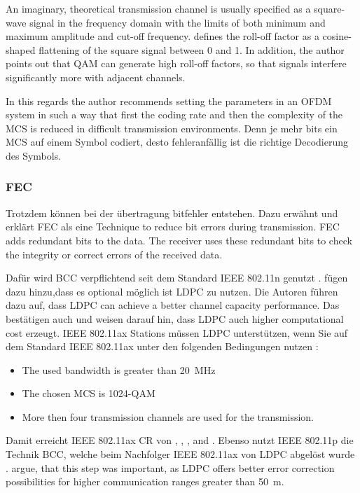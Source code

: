 An imaginary, theoretical transmission channel is usually specified as a square-wave signal in the frequency domain with the limits of both minimum and maximum amplitude and cut-off frequency. \textcite{kauffels_wireless_2002} defines the roll-off factor as a cosine-shaped flattening of the square signal between 0 and 1. In addition, the author points out that \ac{QAM} can generate high roll-off factors, so that signals interfere significantly more with adjacent channels.

In this regards the author recommends setting the parameters in an \ac{OFDM} system in such a way that first the coding rate and then the complexity of the \ac{MCS} is reduced in difficult transmission environments. Denn je mehr bits ein \ac{MCS} auf einem Symbol codiert, desto fehleranfällig ist die richtige Decodierung des Symbols.

\subsubsection*{\acl{FEC}}

Trotzdem können bei der übertragung bitfehler entstehen. Dazu erwähnt und erklärt \cite{knaufel} \ac{FEC} als eine Technique to reduce bit errors during transmission. \ac{FEC} adds redundant bits to the data. The receiver uses these redundant bits to check the integrity or correct errors of the received data. 

Dafür wird \ac{BCC} verpflichtend seit dem Standard IEEE 802.11n genutzt \cite{Challengeax} \cite{performanceLdpc}. \textcite{performanceLdpc} fügen dazu hinzu,dass es optional möglich ist \ac{LDPC} zu nutzen. Die Autoren führen dazu auf, dass \ac{LDPC} can achieve a better channel capacity performance. Das bestätigen auch \textcite{Challengeax} und weisen darauf hin, dass \ac{LDPC} auch higher computational cost erzeugt. 
IEEE 802.11ax Stations müssen \ac{LDPC} unterstützen, wenn Sie auf dem Standard IEEE 802.11ax unter den folgenden Bedingungen nutzen \cite{Challengeax} \cite{standardax}:
\begin{itemize}
	\item The used bandwidth is greater than \SI{20}{\mega\hertz}
	\item The chosen \ac{MCS} is \num{1024}-\ac{QAM}
	\item More then four transmission channels are used for the transmission. 
\end{itemize}
Damit erreicht IEEE 802.11ax \ac{CR} von  , , , and  \cite{standardax}.
Ebenso nutzt IEEE 802.11p die Technik \ac{BCC}, welche beim Nachfolger IEEE 802.11ax von \ac{LDPC} abgelöst wurde \cite{jacobs} \cite{Comparisonpbd}. \textcite{Comparisonpbd} argue, that this step was important, as \ac{LDPC} offers better error correction possibilities for higher communication ranges greater than \SI{50}{\metre}.

